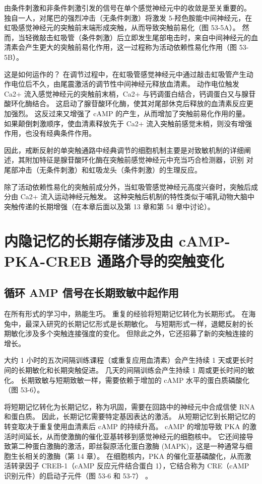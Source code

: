 由条件刺激和非条件刺激引发的信号在单个感觉神经元中的收敛是至关重要的。 独自一人，对尾巴的强烈冲击（无条件刺激）将激发 5-羟色胺能中间神经元，在虹吸感觉神经元的突触前末端形成突触，从而导致突触前易化（图 53-5A）。 然而，当轻微敲击虹吸管（条件刺激）后立即发生尾部电击时，来自中间神经元的血清素会产生更大的突触前易化作用，这一过程称为活动依赖性易化作用（图 53-5B）。

这是如何运作的？ 在调节过程中，在虹吸管感觉神经元中通过敲击虹吸管产生动作电位后不久，由尾震激活的调节性中间神经元释放血清素。 动作电位触发 Ca2+ 流入感觉神经元的突触前末梢，Ca2+ 与钙调蛋白结合，钙调蛋白又与腺苷酸环化酶结合。 这启动了腺苷酸环化酶，使其对尾部休克后释放的血清素反应更加强烈。 这反过来又增强了 cAMP 的产生，从而增加了突触前易化作用的量。 如果颠倒刺激顺序，使血清素释放先于 Ca2+ 流入突触前感觉末梢，则没有增强作用，也没有经典条件作用。

因此，戒断反射的单突触通路中经典调节的细胞机制主要是对致敏机制的详细阐述，其附加特征是腺苷酸环化酶在突触前感觉神经元中充当巧合检测器，识别 对尾部冲击（无条件刺激）和虹吸龙头（条件刺激）的生理反应。

除了活动依赖性易化的突触前成分外，当虹吸管感觉神经元高度兴奋时，突触后成分由 Ca2+ 流入运动神经元触发。 这种突触后机制的特性类似于哺乳动物大脑中突触传递的长期增强（在本章后面以及第 13 章和第 54 章中讨论）。


\section{内隐记忆的长期存储涉及由 cAMP-PKA-CREB 通路介导的突触变化}
\subsection{循环 AMP 信号在长期致敏中起作用}
在所有形式的学习中，熟能生巧。 重复的经验将短期记忆转化为长期形式。 在海兔中，最深入研究的长期记忆形式是长期敏化。 与短期形式一样，退鳃反射的长期敏化涉及多个突触连接强度的变化。 但除此之外，它还招募了新的突触连接的增长。

大约 1 小时的五次间隔训练课程（或重复应用血清素）会产生持续 1 天或更长时间的长期敏化和长期突触促进。 几天的间隔训练会产生持续 1 周或更长时间的敏化。 长期致敏与短期致敏一样，需要依赖于增加的 cAMP 水平的蛋白质磷酸化（图 53-6）。

将短期记忆转化为长期记忆，称为巩固，需要在回路中的神经元中合成信使 RNA 和蛋白质。 因此，长期记忆需要特定基因表达的激活。 从短期记忆到长期记忆的转变取决于重复使用血清素后 cAMP 的持续升高。 cAMP 的增加导致 PKA 的激活时间延长，从而使激酶的催化亚基转移到感觉神经元的细胞核中。 它还间接导致第二种蛋白激酶的激活，即丝裂原活化蛋白激酶 (MAPK)，这是一种通常与细胞生长相关的激酶（第 14 章）。 在细胞核内，PKA 的催化亚基磷酸化，从而激活转录因子 CREB-1（cAMP 反应元件结合蛋白 1），它结合称为 CRE（cAMP 识别元件）的启动子元件（图 53-6 和 53-7） 。

